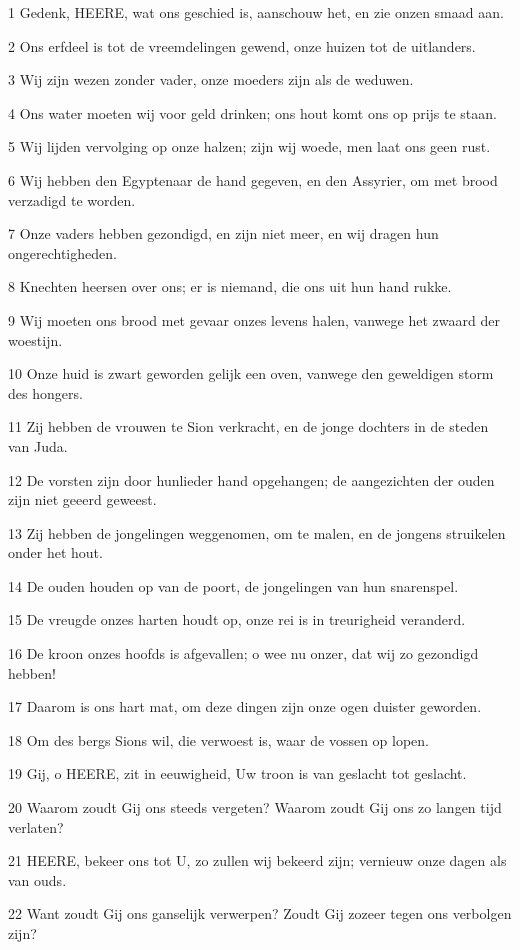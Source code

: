 \par 1 Gedenk, HEERE, wat ons geschied is, aanschouw het, en zie onzen smaad aan.
\par 2 Ons erfdeel is tot de vreemdelingen gewend, onze huizen tot de uitlanders.
\par 3 Wij zijn wezen zonder vader, onze moeders zijn als de weduwen.
\par 4 Ons water moeten wij voor geld drinken; ons hout komt ons op prijs te staan.
\par 5 Wij lijden vervolging op onze halzen; zijn wij woede, men laat ons geen rust.
\par 6 Wij hebben den Egyptenaar de hand gegeven, en den Assyrier, om met brood verzadigd te worden.
\par 7 Onze vaders hebben gezondigd, en zijn niet meer, en wij dragen hun ongerechtigheden.
\par 8 Knechten heersen over ons; er is niemand, die ons uit hun hand rukke.
\par 9 Wij moeten ons brood met gevaar onzes levens halen, vanwege het zwaard der woestijn.
\par 10 Onze huid is zwart geworden gelijk een oven, vanwege den geweldigen storm des hongers.
\par 11 Zij hebben de vrouwen te Sion verkracht, en de jonge dochters in de steden van Juda.
\par 12 De vorsten zijn door hunlieder hand opgehangen; de aangezichten der ouden zijn niet geeerd geweest.
\par 13 Zij hebben de jongelingen weggenomen, om te malen, en de jongens struikelen onder het hout.
\par 14 De ouden houden op van de poort, de jongelingen van hun snarenspel.
\par 15 De vreugde onzes harten houdt op, onze rei is in treurigheid veranderd.
\par 16 De kroon onzes hoofds is afgevallen; o wee nu onzer, dat wij zo gezondigd hebben!
\par 17 Daarom is ons hart mat, om deze dingen zijn onze ogen duister geworden.
\par 18 Om des bergs Sions wil, die verwoest is, waar de vossen op lopen.
\par 19 Gij, o HEERE, zit in eeuwigheid, Uw troon is van geslacht tot geslacht.
\par 20 Waarom zoudt Gij ons steeds vergeten? Waarom zoudt Gij ons zo langen tijd verlaten?
\par 21 HEERE, bekeer ons tot U, zo zullen wij bekeerd zijn; vernieuw onze dagen als van ouds.
\par 22 Want zoudt Gij ons ganselijk verwerpen? Zoudt Gij zozeer tegen ons verbolgen zijn?



